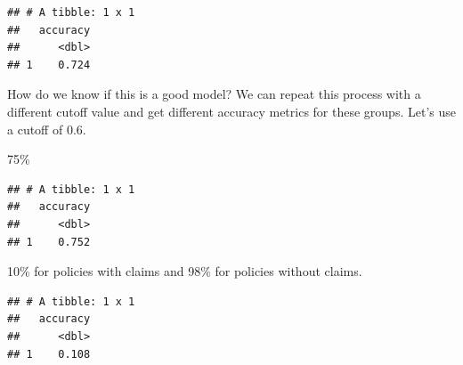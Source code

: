 \documentclass[openany]{book}
\newenvironment{Shaded}{\begin{snugshade}}{\end{snugshade}}
\newcommand{\DataTypeTok}[1]{\textcolor[rgb]{0.13,0.29,0.53}{#1}}
\newcommand{\DecValTok}[1]{\textcolor[rgb]{0.00,0.00,0.81}{#1}}
\newcommand{\KeywordTok}[1]{\textcolor[rgb]{0.13,0.29,0.53}{\textbf{#1}}}
\newcommand{\NormalTok}[1]{#1}
\newcommand{\OperatorTok}[1]{\textcolor[rgb]{0.81,0.36,0.00}{\textbf{#1}}}
\newcommand{\StringTok}[1]{\textcolor[rgb]{0.31,0.60,0.02}{#1}}
\begin{document}
\begin{verbatim}
## # A tibble: 1 x 1
##   accuracy
##      <dbl>
## 1    0.724
\end{verbatim}

How do we know if this is a good model? We can repeat this process with a different cutoff value and get different accuracy metrics for these groups. Let's use a cutoff of 0.6.

75\%

\begin{Shaded}
\end{Shaded}

\begin{verbatim}
## # A tibble: 1 x 1
##   accuracy
##      <dbl>
## 1    0.752
\end{verbatim}

10\% for policies with claims and 98\% for policies without claims.

\begin{Shaded}
\end{Shaded}

\begin{verbatim}
## # A tibble: 1 x 1
##   accuracy
##      <dbl>
## 1    0.108
\end{verbatim}

\begin{Shaded}
\end{Shaded}
\end{document}
